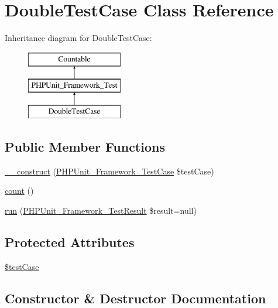 \hypertarget{class_double_test_case}{}\section{Double\+Test\+Case Class Reference}
\label{class_double_test_case}
Inheritance diagram for Double\+Test\+Case\+:\begin{figure}[H]
\begin{center}
\leavevmode
\includegraphics[height=3.000000cm]{class_double_test_case}
\end{center}
\end{figure}
\subsection*{Public Member Functions}
\begin{DoxyCompactItemize}
\item 
\mbox{\hyperlink{class_double_test_case_a15fa4e468239584b204209d59a9a0017}{\+\_\+\+\_\+construct}} (\mbox{\hyperlink{class_p_h_p_unit___framework___test_case}{P\+H\+P\+Unit\+\_\+\+Framework\+\_\+\+Test\+Case}} \$test\+Case)
\item 
\mbox{\hyperlink{class_double_test_case_ac751e87b3d4c4bf2feb03bee8b092755}{count}} ()
\item 
\mbox{\hyperlink{class_double_test_case_aba2e5a83092b40735a7a61c572cd6256}{run}} (\mbox{\hyperlink{class_p_h_p_unit___framework___test_result}{P\+H\+P\+Unit\+\_\+\+Framework\+\_\+\+Test\+Result}} \$result=null)
\end{DoxyCompactItemize}
\subsection*{Protected Attributes}
\begin{DoxyCompactItemize}
\item 
\mbox{\hyperlink{class_double_test_case_ab3a28d78c2905f98818a9bee6fb95b35}{\$test\+Case}}
\end{DoxyCompactItemize}


\subsection{Constructor \& Destructor Documentation}
\mbox{\label{class_double_test_case_a15fa4e468239584b204209d59a9a0017}} 
